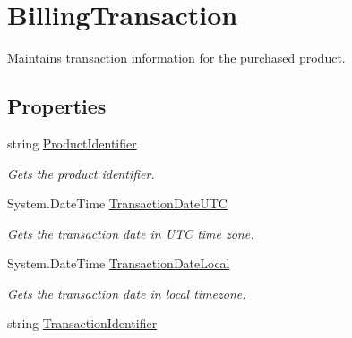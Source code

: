 \hypertarget{class_voxel_busters_1_1_native_plugins_1_1_billing_transaction}{}\section{Billing\+Transaction}
\label{class_voxel_busters_1_1_native_plugins_1_1_billing_transaction}


Maintains transaction information for the purchased product.  


\subsection*{Properties}
\begin{DoxyCompactItemize}
\item 
string \hyperlink{class_voxel_busters_1_1_native_plugins_1_1_billing_transaction_a318cd56e0b5431348b89762286588f95}{Product\+Identifier}
\begin{DoxyCompactList}\small\item\em Gets the product identifier. \end{DoxyCompactList}\item 
System.\+Date\+Time \hyperlink{class_voxel_busters_1_1_native_plugins_1_1_billing_transaction_aafb5a2bf337c66d069096a9b575b70b0}{Transaction\+Date\+U\+T\+C}
\begin{DoxyCompactList}\small\item\em Gets the transaction date in U\+T\+C time zone. \end{DoxyCompactList}\item 
System.\+Date\+Time \hyperlink{class_voxel_busters_1_1_native_plugins_1_1_billing_transaction_a0c921c1ebad1e4660a034dfd05b33baa}{Transaction\+Date\+Local}
\begin{DoxyCompactList}\small\item\em Gets the transaction date in local timezone. \end{DoxyCompactList}\item 
string \hyperlink{class_voxel_busters_1_1_native_plugins_1_1_billing_transaction_aa4e1d3a040d4acf83bf860c79d34c05b}{Transaction\+Identifier}

\end{DoxyCompactItemize}
